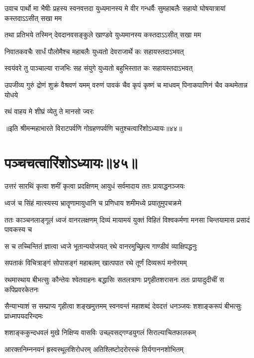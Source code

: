 
\onelineshloka
{उवाच पार्थो मा भैषीः प्रहस्य स्वनवत्तदा}
\twolineshloka
{युध्यमानस्य मे वीर गन्धर्वैः सुमहाबलैः}
{सहायो घोषयात्रायां कस्तदाऽऽसीत् सखा मम}


\twolineshloka
{तथा प्रतिभये तस्मिन् देवदानवसङ्कुले}
{खाण्डवे युध्यमानस्य कस्तदाऽऽसीत् सखा मम}


\twolineshloka
{निवातकवचैः सार्धं पौलोमैश्च महाबलैः}
{युध्यतो देवराजार्थे कः सहायस्तदाऽभवत्}


\twolineshloka
{स्वयंवरे तु पाञ्चाल्या राजभिः सह संयुगे}
{युध्यतो बहुभिस्तात कः सहायस्तदाऽभवत्}


\threelineshloka
{उपजीव्य गुरुं द्रोणं शुक्रं वैश्रवणं यमम्}
{वरुणं पावकं चैव कृपं कृष्णं च माधवम्}
{पिनाकपाणिनं चैव कथमेतान्न योधये}


\onelineshloka
{रथं वाहय मे शीघ्रं व्येतु ते मानसो ज्वरः}


॥इति श्रीमन्महाभारते विराटपर्वणि गोग्रहणपर्वणि चतुश्चत्वारिंशोऽध्यायः॥४४॥

\chapter{पञ्चचत्वारिंशोऽध्यायः॥४५॥}

\twolineshloka
{उत्तरं सारथिं कृत्वा शमीं कृत्वा प्रदक्षिणम्}
{आयुधं सर्वमादाय ततः प्रायाद्धनञ्जयः}


\twolineshloka
{ध्वजं च सिंहं मात्स्यस्य भ्रातॄणामायुधानि च}
{प्रणिधाय शमीमध्ये प्रयातुमुपचक्रमे}


\threelineshloka
{ततः काञ्चनलाङ्गूलं ध्वजं वानरलक्षणम्}
{दिव्यं मायामयं युक्तं विहितं विश्वकर्मणा}
{मनसा चिन्तयामास प्रसादं पावकस्य च}


\twolineshloka
{स च तच्चिन्तितं ज्ञात्वा ध्वजे भूतान्ययोजयत्}
{रथे वानरमुच्छ्रित्य गाण्डीवं व्याक्षिपद्धनुः}


\twolineshloka
{सपताकं विचित्राङ्गं सोपासङ्गं महाबलम्}
{खात्पपात रथे तूर्णं दिव्यरूपं मनोरमम्}


\threelineshloka
{रथमास्थाय बीभत्सुः कौन्तेयः श्वेतवाहनः}
{बद्धासिः सतलत्राणः प्रगृहीतशरासनः}
{ततः प्रायादुदीचीं स कपिप्रवरकेतनः}


\threelineshloka
{सैन्याभ्याशं स सम्प्राप्य गृहीत्वा शङ्खमुत्तमम्}
{स्वनवन्तं महाशब्दं देवदत्तं धनञ्जयः}
{शशाङ्करूपं बीभत्सुः प्राध्मापयदरिन्दमः}


\twolineshloka
{शशाङ्ककुन्दधवलं मुखे निक्षिप्य वासविः}
{उच्छ्वसद्गण्डयुगलं सिराल्याचितफालकम्}


\twolineshloka
{आरक्तनिम्ननयनं ह्रस्वस्थूलशिरोधरम्}
{अतिश्लिष्टोदरोरस्कं तिर्यगाननशोभितम्}


